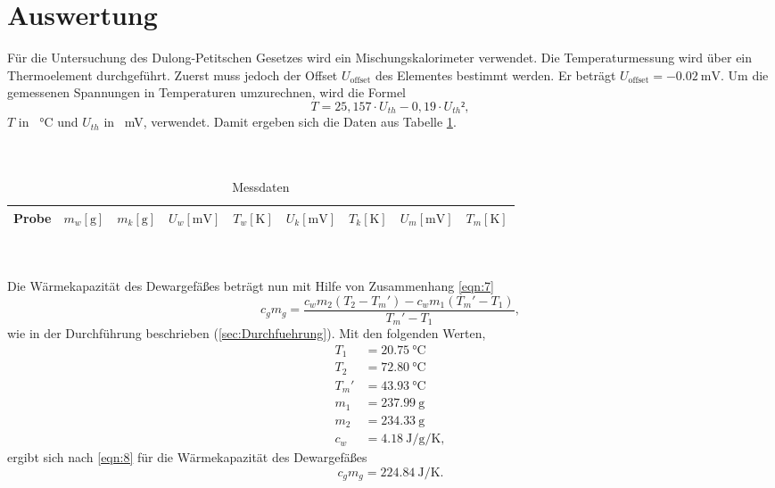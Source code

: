 \section{Auswertung}
\label{sec:Auswertung}

Für die Untersuchung des Dulong-Petitschen Gesetzes wird ein Mischungskalorimeter verwendet.
Die Temperaturmessung wird über ein Thermoelement durchgeführt.
Zuerst muss jedoch der Offset $U_{\text{offset}}$ des Elementes bestimmt werden.
Er beträgt $U_{\text{offset}}= \SI{-0,02}{\milli\volt}$.
Um die gemessenen Spannungen in Temperaturen umzurechnen, wird die Formel
\begin{equation}
  T = 25,157 \cdot U_{th} - 0,19 \cdot U_{th}²,
\end{equation}
$T$ in \SI{}{\celsius} und $U_{th}$ in \SI{}{\milli\volt}, verwendet.
Damit ergeben sich die Daten aus Tabelle \ref{tab:1}. \\
\\
\\
\begin{table}
  \centering
  \caption{Messdaten}
  \label{tab:1}
  \begin{tabular}{c c c c c c c c c}
    \toprule
    {Probe} & {$m_w [\si{\gram}]$} & {$m_k [\si{\gram}]$} & {$U_w [\si{\milli\volt}]$} & {$T_w [\si{\kelvin}]$} & {$U_k [\si{\milli\volt}]$} & {$T_k [\si{\kelvin}]$} & {$U_m [\si{\milli\volt}]$} & {$T_m [\si{\kelvin}]$} \\
    \midrule
    
    \bottomrule
  \end{tabular}
\end{table}
\\
\\
Die Wärmekapazität des Dewargefäßes beträgt nun mit Hilfe von Zusammenhang \ref{eqn:7}
\begin{equation}
  c_gm_g = \frac{c_wm_2(T_2-T_m')-c_wm_1(T_m'-T_1)}{T_m'-T_1},
  \label{eqn:8}
\end{equation}
wie in der Durchführung beschrieben (\ref{sec:Durchfuehrung}).
Mit den folgenden Werten,
\begin{align}
  T_1 &= \SI{20,75}{\celsius} \\
  T_2 &= \SI{72,80}{\celsius} \\
  T_m'&= \SI{43,93}{\celsius} \\
  m_1 &= \SI{237,99}{\gram} \\
  m_2 &= \SI{234,33}{\gram} \\
  c_w &= \SI{4,18}{\joule\per\gram\per\kelvin},
\end{align}
ergibt sich nach \ref{eqn:8} für die Wärmekapazität des Dewargefäßes
\begin{equation}
  c_gm_g = \SI{224,84}{\joule\per\kelvin}.
\end{equation}

